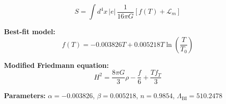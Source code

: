 
\begin{equation}
  S = \int d^4x \, |e| \, \frac{1}{16\pi G} \left[ f(T) + \mathcal{L}_m \right]
\end{equation}

\textbf{Best-fit model:}
\begin{equation}
  f(T) = -0.003826 T + 0.005218 T \ln\!\left(\frac{T}{T_0}\right)
\end{equation}

\textbf{Modified Friedmann equation:}
\begin{equation}
  H^2 = \frac{8\pi G}{3} \rho - \frac{f}{6} + \frac{T f_T}{3}
\end{equation}

\textbf{Parameters:}
$\alpha = -0.003826$, \quad
$\beta = 0.005218$, \quad
$n = 0.9854$, \quad
$\Lambda_{\text{BI}} = 510.2478$